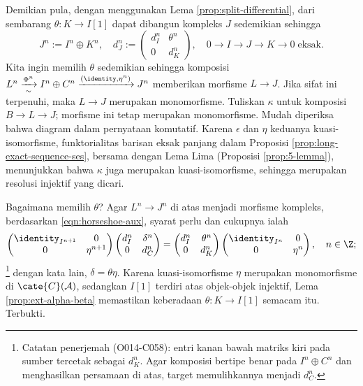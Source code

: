 \begin{bukti}
	Demikian pula, dengan menggunakan Lema \ref{prop:split-differential}, dari sembarang $\theta: K \to I[1]$ dapat dibangun kompleks $J$ sedemikian sehingga
	\[ J^n := I^n \oplus K^n, \quad d_J^n := \begin{pmatrix}
		d_I^n & \theta^n \\
		0 & d_K^n
	\end{pmatrix}, \quad 0 \to I \to J \to K \to 0 \;\text{eksak}. \]
	Kita ingin memilih $\theta$ sedemikian sehingga komposisi $L^n \xrightarrow[\sim]{\Phi^n} I^n \oplus C^n \xrightarrow{(\identity, \eta^n)} J^n$ memberikan morfisme $L \to J$. Jika sifat ini terpenuhi, maka $L \to J$ merupakan monomorfisme. Tuliskan $\kappa$ untuk komposisi $B \to L \to J$; morfisme ini tetap merupakan monomorfisme. Mudah diperiksa bahwa diagram dalam pernyataan komutatif. Karena $\epsilon$ dan $\eta$ keduanya kuasi-isomorfisme, funktorialitas barisan eksak panjang dalam Proposisi \ref{prop:long-exact-sequence-ses}, bersama dengan Lema Lima (Proposisi \ref{prop:5-lemma}), menunjukkan bahwa $\kappa$ juga merupakan kuasi-isomorfisme, sehingga merupakan resolusi injektif yang dicari.

	Bagaimana memilih $\theta$? Agar $L^n \to J^n$ di atas menjadi morfisme kompleks, berdasarkan \eqref{eqn:horseshoe-aux}, syarat perlu dan cukupnya ialah
	\[\begin{pmatrix}
		\identity_{I^{n+1}} & 0 \\
		0 & \eta^{n+1}
	\end{pmatrix} \begin{pmatrix}
		d_I^n & \delta^n \\
		0 & d_C^n
	\end{pmatrix} = \begin{pmatrix}
		d_I^n & \theta^n \\
		0 & d_K^n \\
	\end{pmatrix} \begin{pmatrix}
		\identity_{I^n} & 0 \\
		0 & \eta^n
	\end{pmatrix}, \quad n \in \Z ; \]
\footnote{Catatan penerjemah (O014-C058): entri kanan bawah matriks kiri
pada sumber tercetak sebagai $d_K^n$. Agar komposisi bertipe benar pada
$I^n\oplus C^n$ dan menghasilkan persamaan di atas, target memulihkannya
menjadi $d_C^n$.}
	dengan kata lain, $\delta = \theta \eta$. Karena kuasi-isomorfisme $\eta$ merupakan monomorfisme di $\cate{C}(\mathcal{A})$, sedangkan $I[1]$ terdiri atas objek-objek injektif, Lema \ref{prop:ext-alpha-beta} memastikan keberadaan $\theta: K \to I[1]$ semacam itu. Terbukti.
\end{bukti}

